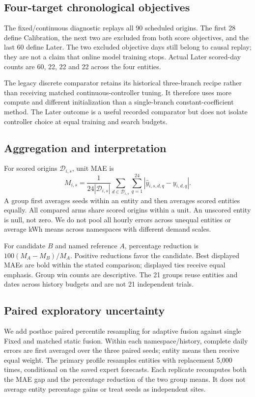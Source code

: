 \documentclass[pdflatex,iicol,sn-mathphys-num]{sn-jnl}
\begin{document}
\subsection{Four-target chronological objectives}
The fixed/continuous diagnostic replays all 90 scheduled origins. The first 28 define Calibration, the next two are excluded from both score objectives, and the last 60 define Later. The two excluded objective days still belong to causal replay; they are not a claim that online model training stops. Actual Later scored-day counts are 60, 22, 22 and 22 across the four entities.

The legacy discrete comparator retains its historical three-branch recipe rather than receiving matched continuous-controller tuning. It therefore uses more compute and different initialization than a single-branch constant-coefficient method. The Later outcome is a useful recorded comparator but does not isolate controller choice at equal training and search budgets.

\subsection{Aggregation and interpretation}
For scored origins $\mathcal D_{i,s}$, unit MAE is
\begin{equation}
M_{i,s}=\frac{1}{24|\mathcal D_{i,s}|}
\sum_{d\in\mathcal D_{i,s}}\sum_{q=1}^{24}
|\hat y_{i,s,d,q}-y_{i,d,q}|.
\label{eq:mae}\end{equation}
A group first averages seeds within an entity and then averages scored entities equally. All compared arms share scored origins within a unit. An unscored entity is null, not zero. We do not pool all hourly errors across unequal entities or average kWh means across namespaces with different demand scales.

For candidate $B$ and named reference $A$, percentage reduction is $100(M_A-M_B)/M_A$. Positive reductions favor the candidate. Best displayed MAEs are bold within the stated comparison; displayed ties receive equal emphasis. Group win counts are descriptive. The 21 groups reuse entities and dates across history budgets and are not 21 independent trials.

\subsection{Paired exploratory uncertainty}
We add posthoc paired percentile resampling for adaptive fusion against single Fixed and matched static fusion. Within each namespace/history, complete daily errors are first averaged over the three paired seeds; entity means then receive equal weight. The primary profile resamples entities with replacement 5,000 times, conditional on the saved expert forecasts. Each replicate recomputes both the MAE gap and the percentage reduction of the two group means. It does not average entity percentage gains or treat seeds as independent sites.
\end{document}
